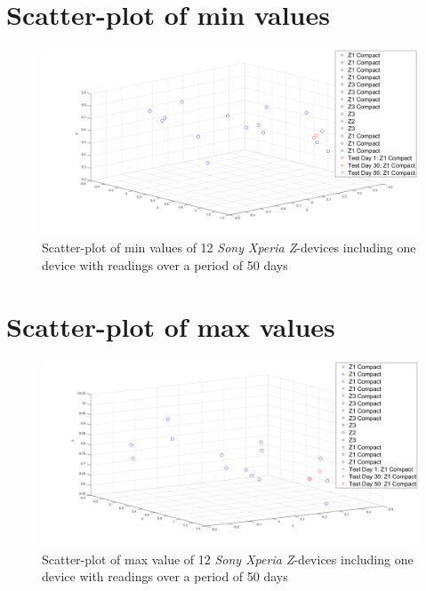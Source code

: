 \section*{Scatter-plot of min values}
\begin{figure}[H]
	\centering
	\includegraphics[scale=.3]{img/features/min}
	\caption{Scatter-plot of min values of 12  \textit{Sony Xperia Z}-devices including one device with readings over a period of 50 days}
	\label{fig:feature:min}
\end{figure}

\section*{Scatter-plot of max values}
\begin{figure}[H]
	\centering
	\includegraphics[scale=.3]{img/features/max}
	\caption{Scatter-plot of max value of 12  \textit{Sony Xperia Z}-devices including one device with readings over a period of 50 days}
	\label{fig:feature:max}
\end{figure}


